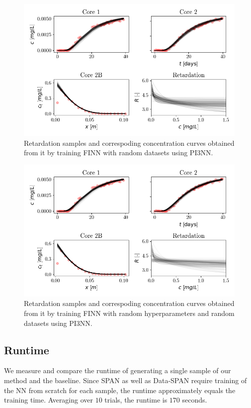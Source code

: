 \begin{figure}[h]
    \centering
    \includegraphics{figs/finn_dataspan_samples.png}
    \caption{Retardation samples and correspoding concentration curves obtained from it by training FINN with random datasets using PI3NN.}
    \label{fig:dataspan_samples}
\end{figure}

\begin{figure}[h]
    \centering
    \includegraphics{figs/finn_fullspan_samples.png}
    \caption{Retardation samples and correspoding concentration curves obtained from it by training FINN with random hyperparameters and random datasets using PI3NN.}
    \label{fig:fullspan_samples}
\end{figure}




\subsection{Runtime}
We measure and compare the runtime of generating a single sample of our method and the baseline. Since SPAN as well as Data-SPAN require training of the NN from scratch for each sample, the runtime approximately equals the training time. Averaging over $10$ trials, the runtime is $170$ seconds.

